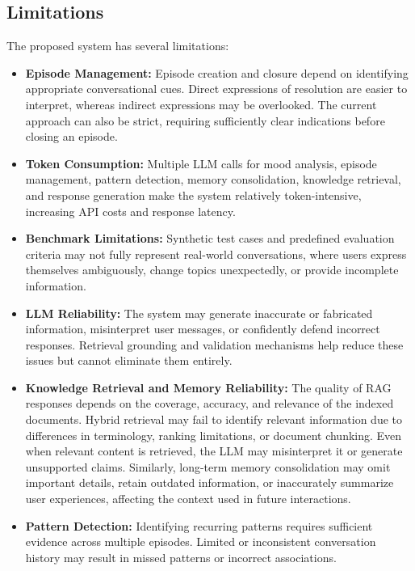 \documentclass[conference]{IEEEtran}
\begin{document}
\subsection{Limitations}
The proposed system has several limitations:
\begin{itemize}
    \item \textbf{Episode Management:} Episode creation and closure depend on identifying appropriate conversational cues. Direct expressions of resolution are easier to interpret, whereas indirect expressions may be overlooked. The current approach can also be strict, requiring sufficiently clear indications before closing an episode.

    \item \textbf{Token Consumption:} Multiple LLM calls for mood analysis, episode management, pattern detection, memory consolidation, knowledge retrieval, and response generation make the system relatively token-intensive, increasing API costs and response latency.

    \item \textbf{Benchmark Limitations:} Synthetic test cases and predefined evaluation criteria may not fully represent real-world conversations, where users express themselves ambiguously, change topics unexpectedly, or provide incomplete information.

    \item \textbf{LLM Reliability:} The system may generate inaccurate or fabricated information, misinterpret user messages, or confidently defend incorrect responses. Retrieval grounding and validation mechanisms help reduce these issues but cannot eliminate them entirely.


    \item \textbf{Knowledge Retrieval and Memory Reliability:} The quality of RAG responses depends on the coverage, accuracy, and relevance of the indexed documents. Hybrid retrieval may fail to identify relevant information due to differences in terminology, ranking limitations, or document chunking. Even when relevant content is retrieved, the LLM may misinterpret it or generate unsupported claims. Similarly, long-term memory consolidation may omit important details, retain outdated information, or inaccurately summarize user experiences, affecting the context used in future interactions.

    
    \item \textbf{Pattern Detection:} Identifying recurring patterns requires sufficient evidence across multiple episodes. Limited or inconsistent conversation history may result in missed patterns or incorrect associations.


\end{itemize}
\end{document}
